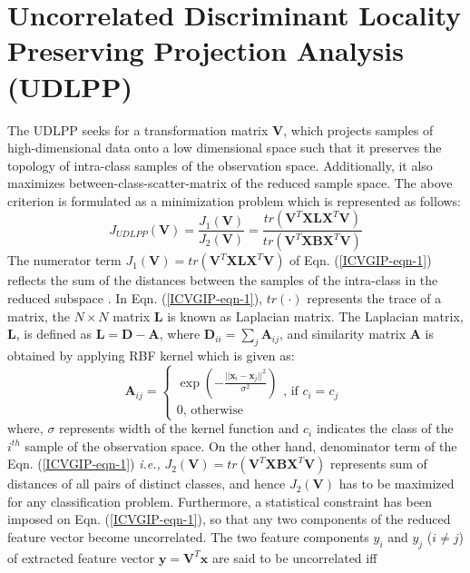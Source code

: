 \section{Uncorrelated Discriminant Locality Preserving Projection Analysis (UDLPP)}\label{AppendixUDLPP}
\noindent The UDLPP \cite{yu2008uncorrelated} seeks for a transformation matrix ${\mathbf{V}}$, which projects samples of high-dimensional data onto a low dimensional space such that it preserves the topology of intra-class samples of the observation space. Additionally, it also maximizes between-class-scatter-matrix of the reduced sample space. The above criterion is formulated as a minimization problem which is represented as follows:
\begin{equation}\label{ICVGIP-eqn-1}
{J_{UDLPP}}\left( {\mathbf{V}} \right) = \frac{{{J_1}\left( {\mathbf{V}} \right)}}{{{J_2}\left( {\mathbf{V}} \right)}} = \frac{{tr\left( {{{\mathbf{V}}^T}{\mathbf{XL}}{{\mathbf{X}}^T}{\mathbf{V}}} \right)}}{{tr\left( {{{\mathbf{V}}^T}{\mathbf{XB}}{{\mathbf{X}}^T}{\mathbf{V}}} \right)}}
\end{equation} 
The numerator term ${J_1}\left( {\mathbf{V}} \right) = tr\left( {{{\mathbf{V}}^T}{\mathbf{XL}}{{\mathbf{X}}^T}{\mathbf{V}}} \right)$ of Eqn. (\ref{ICVGIP-eqn-1}) reflects the sum of the distances between the samples of the intra-class in the reduced subspace \cite{eleftheriadis2015discriminative}. In Eqn. (\ref{ICVGIP-eqn-1}), $tr\left(  \cdot  \right)$ represents the trace of a matrix, the $N \times N$ matrix ${\mathbf{L}}$ is known as Laplacian matrix. The Laplacian matrix, ${\mathbf{L}}$, is defined as ${\mathbf{L}} = {\mathbf{D}} - {\mathbf{A}}$, where ${{\mathbf{D}}_{ii}} = \sum\nolimits_j {{{\mathbf{A}}_{ij}}} $, and similarity matrix ${\mathbf{A}}$ is obtained by applying RBF kernel which is given as:
\begin{equation}\label{ICVGIP-eqn-2}
{{\mathbf{A}}_{ij}} = \left\{ {\begin{array}{*{20}{lc}}
  {\exp \left( { - \frac{{||{{\mathbf{x}}_i} - {{\mathbf{x}}_j}|{|^2}}}{{\sigma}^2 }} \right)} \\ 
  {0{\text{,     otherwise}}} 
\end{array}} \right.{\text{, if }}{c_i} = {c_j}{\text{ }}
\end{equation}
where, $\sigma$ represents width of the kernel function and ${c_i}$ indicates the class of the $i^{th}$ sample of the observation space. On the other hand, denominator term of the Eqn. (\ref{ICVGIP-eqn-1}) {\em i.e.,} ${J_2}\left( {\mathbf{V}} \right) = tr\left( {{{\mathbf{V}}^T}{\mathbf{XB}}{{\mathbf{X}}^T}{\mathbf{V}}} \right)$ represents sum of distances of all pairs of distinct classes, and hence ${J_2}\left( {\mathbf{V}} \right)$ has to be maximized for any classification problem. Furthermore, a statistical constraint has been imposed on Eqn. (\ref{ICVGIP-eqn-1}), so that any two components of the reduced feature vector become uncorrelated. The two feature components $y_i$ and $y_j$ ($i\ne j$) of extracted feature vector ${\mathbf{y}} = {{\mathbf{V}}^T}{\mathbf{x}}$ are said to be uncorrelated iff 
